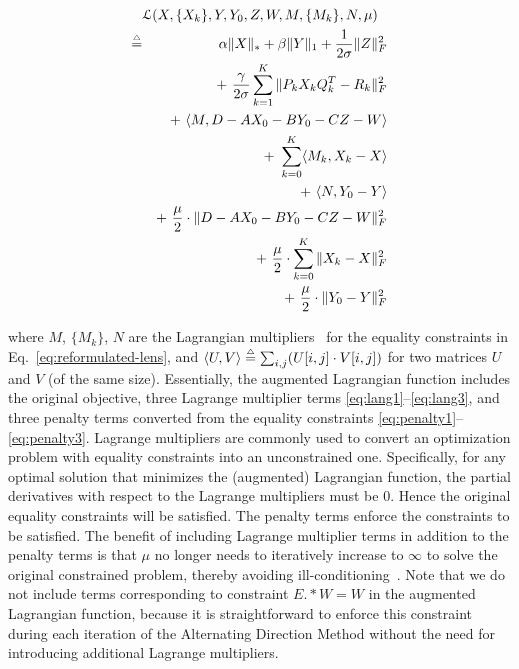 \begin{small}
\begin{eqnarray}
\lefteqn{\mathcal{L}(X,\{X_k\},Y,Y_0,Z,W,M,\{M_k\},N,\mu)}\nonumber\\
\defas&&\alpha\|X\|_* + \beta\|Y\|_1 + \frac{1}{2\sigma}\|Z\|_F^2\nonumber\\
&&   +~ \frac{\gamma}{2\sigma} \sum_{k=1}^K \|P_k X_k Q_k^T-R_k\|_F^2\nonumber\\
&&   +~ \langle M,D-AX_0-BY_0-CZ-W \rangle \label{eq:lang1}\\ 
&&   +~ \sum_{k=0}^K\langle M_k,X_k-X\rangle \label{eq:lang2}\\
&&   +~ \langle N,Y_0-Y \rangle \label{eq:lang3}\\
&&   +~ \frac{\mu}{2}\cdot \|D-AX_0-BY_0-CZ-W\|_F^2 \label{eq:penalty1}\\
&&   +~ \frac{\mu}{2}\cdot \sum_{k=0}^K \|X_k-X\|_F^2 \label{eq:penalty2}\\
&&   +~ \frac{\mu}{2}\cdot \|Y_0-Y\|_F^2 \label{eq:penalty3}
\end{eqnarray}
\end{small}
where $M$, $\{M_k\}$, $N$ are the Lagrangian
multipliers~\cite{lag-multiplier} for the equality constraints in
Eq.~\eqref{eq:reformulated-lens}, and $\langle U, V\rangle \stackrel{\scriptscriptstyle{\triangle}}{=}
\sum_{i,j} (U[i,j] \cdot V[i,j])$ for two matrices $U$ and $V$ (of the
same size).  Essentially, the augmented Lagrangian function includes
the original objective, three Lagrange multiplier terms
\eqref{eq:lang1}--\eqref{eq:lang3}, and three penalty terms converted
from the equality constraints
\eqref{eq:penalty1}--\eqref{eq:penalty3}.  Lagrange multipliers are
commonly used to convert an optimization problem with equality
constraints into an unconstrained one.  Specifically, for any optimal
solution that minimizes the (augmented) Lagrangian function, the
partial derivatives with respect to the Lagrange multipliers must be
0.  Hence the original equality constraints will be satisfied.  The
penalty terms enforce the constraints to be satisfied.  The benefit of
including Lagrange multiplier terms in addition to the penalty terms
is that $\mu$ no longer needs to iteratively increase to $\infty$ to
solve the original constrained problem, thereby avoiding
ill-conditioning~\cite{adm}.  Note that we do not include terms
corresponding to constraint $E.*W=W$ in the augmented Lagrangian
function, because it is straightforward to enforce this constraint
during each iteration of the Alternating Direction Method without the
need for introducing additional Lagrange multipliers.

